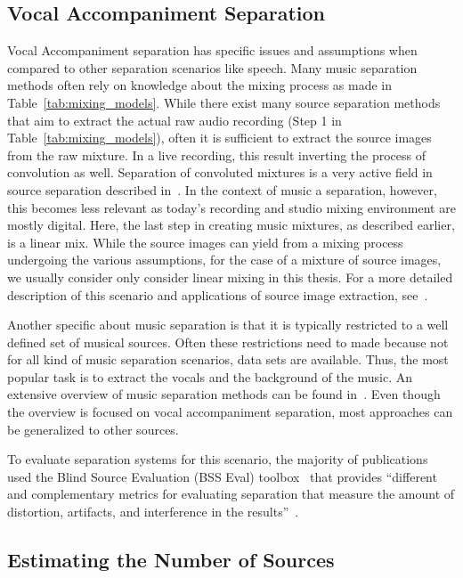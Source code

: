 \subsection{Vocal Accompaniment Separation}
Vocal Accompaniment separation has specific issues and assumptions when compared to other separation scenarios like speech.
Many music separation methods often rely on knowledge about the mixing process as made in Table~\ref{tab:mixing_models}.
While there exist many source separation methods that aim to extract the actual raw audio recording (Step 1 in  Table~\ref{tab:mixing_models}), often it is sufficient to extract the source images from the raw mixture.
In a live recording, this result inverting the process of convolution as well.
Separation of convoluted mixtures is a very active field in source separation described in~\cite{pedersen07}.
In the context of music a separation, however, this becomes less relevant as today's recording and studio mixing environment are mostly digital.
Here, the last step in creating music mixtures, as described earlier, is a linear mix.
While the source images can yield from a mixing process undergoing the various assumptions, for the case of a mixture of source images, we usually consider only consider linear mixing in this thesis.
For a more detailed description of this scenario and applications of source image extraction, see~\cite{sturmel12}.
\par
Another specific about music separation is that it is typically restricted to a well defined set of musical sources.
Often these restrictions need to made because not for all kind of music separation scenarios, data sets are available.
Thus, the most popular task is to extract the vocals and the background of the music.
An extensive overview of music separation methods can be found in~\cite{rafii18}.
Even though the overview is focused on vocal accompaniment separation, most approaches can be generalized to other sources.
\par
To evaluate separation systems for this scenario, the majority of publications used the Blind Source Evaluation (BSS Eval) toolbox~\cite{fevotte05,vincent06} that provides ``different and complementary metrics for evaluating separation that measure the amount of distortion, artifacts, and interference in the results''~\cite{rafii18}.

\subsection{Estimating the Number of Sources}%
\label{sub:count_problemstatement}

